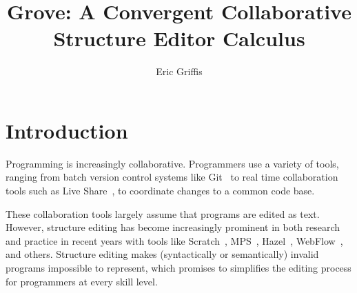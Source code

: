 \documentclass[nonacm, acmsmall, screen, review]{acmart}
\begin{document}
\title[Grove]{Grove: A Convergent Collaborative Structure Editor Calculus}


\author{Eric Griffis}


\maketitle



\section{Introduction}
\label{sec:introduction}


Programming is increasingly collaborative.
Programmers use a variety of tools, ranging from batch version control systems like Git~\cite{chacon_pro_2014} to real time collaboration tools such as Live Share~\cite{noauthor_use_nodate}, to coordinate changes to a common code base.

These collaboration tools largely assume that programs are edited as text.
However, structure editing has become increasingly prominent in both research and practice in recent years with tools like 
Scratch~\cite{resnick_scratch_2009}, 
MPS~\cite{voelter_language_2011}, 
Hazel~\cite{omar_hazelnut_2017}, 
WebFlow~\cite{noauthor_webflow_nodate},
and others.
Structure editing makes (syntactically or semantically) invalid programs impossible to represent, which promises to simplifies the editing process for programmers at every skill level.
\end{document}
